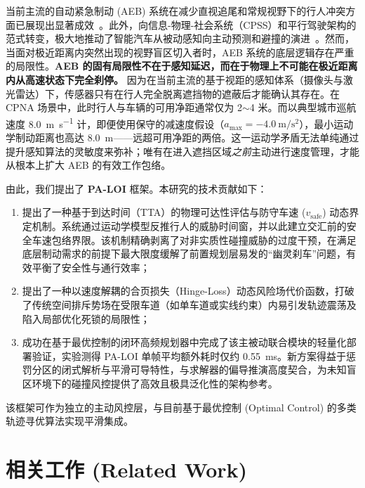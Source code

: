 \documentclass[conference]{IEEEtran}
\begin{document}
当前主流的自动紧急制动 (AEB) 系统在减少直视追尾和常规视野下的行人冲突方面已展现出显著成效~\cite{cicchino2022effects}。此外，向信息-物理-社会系统（CPSS）和平行驾驶架构的范式转变，极大地推动了智能汽车从被动感知向主动预测和避撞的演进~\cite{wang2024parallel, wang2021review}。然而，当面对极近距离内突然出现的视野盲区切入者时，AEB 系统的底层逻辑存在严重的局限性。\textbf{AEB 的固有局限性不在于感知延迟，而在于物理上不可能在极近距离内从高速状态下完全刹停。} 因为在当前主流的基于视距的感知体系（摄像头与激光雷达）下，传感器只有在行人完全脱离遮挡物的遮蔽后才能确认其存在。在 CPNA 场景中，此时行人与车辆的可用净距通常仅为 2$\sim$4 米。而以典型城市巡航速度 \SI{8.0}{\meter\per\second} 计，即便使用保守的减速度假设（$a_{\text{max}} = \SI{-4.0}{\meter\per\second\squared}$），最小运动学制动距离也高达 \SI{8.0}{\meter}——远超可用净距的两倍。这一运动学矛盾无法单纯通过提升感知算法的灵敏度来弥补；唯有在进入遮挡区域\emph{之前}主动进行速度管理，才能从根本上扩大 AEB 的有效工作包络。

由此，我们提出了 \textbf{PA-LOI} 框架。本研究的技术贡献如下：
\begin{enumerate}
    \item 提出了一种基于到达时间（TTA）的物理可达性评估与防守车速 ($v_{\text{safe}}$) 动态界定机制。系统通过运动学模型反推行人的威胁时间窗，并以此建立交汇前的安全车速包络界限。该机制精确剥离了对非实质性碰撞威胁的过度干预，在满足底层制动需求的前提下最大限度缓解了前置规划层易发的“幽灵刹车”问题，有效平衡了安全性与通行效率；
    \item 提出了一种以速度解耦的合页损失（Hinge-Loss）动态风险场代价函数，打破了传统空间排斥势场在受限车道（如单车道或实线约束）内易引发轨迹震荡及陷入局部优化死锁的局限性；
    \item 成功在基于最优控制的闭环高频规划器中完成了该主被动联合模块的轻量化部署验证，实验测得 PA-LOI 单帧平均额外耗时仅约 \SI{0.55}{\milli\second}。新方案得益于惩罚分区的闭式解析与平滑可导特性，与求解器的偏导推演高度契合，为未知盲区环境下的碰撞风控提供了高效且极具泛化性的架构参考。
\end{enumerate}

该框架可作为独立的主动风控层，与目前基于最优控制 (Optimal Control) 的多类轨迹寻优算法实现平滑集成。

\section{相关工作 (Related Work)}
\end{document}
